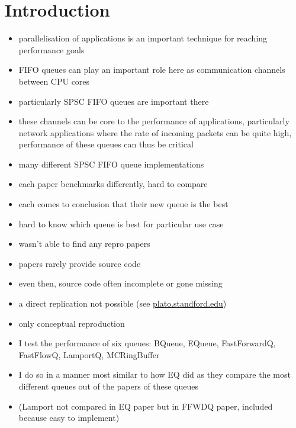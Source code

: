 \section{Introduction}
\begin{itemize}
    \item parallelisation of applications is an important technique for reaching performance goals
    \item FIFO queues can play an important role here as communication channels between CPU cores
    \item particularly SPSC FIFO queues are important there
    \item these channels can be core to the performance of applications, particularly network applications
        where the rate of incoming packets can be quite high, performance of these queues can thus be critical
    \item many different SPSC FIFO queue implementations
    \item each paper benchmarks differently, hard to compare
    \item each comes to conclusion that their new queue is the best
    \item hard to know which queue is best for particular use case
    \item wasn't able to find any repro papers
    \item papers rarely provide source code
    \item even then, source code often incomplete or gone missing
    \item a direct replication not possible (see
            \href{https://plato.stanford.edu/entries/scientific-reproducibility/#:~:text=direct
                replication%
                conceptual%
                to%
        }{plato.standford.edu})
    \item only conceptual reproduction
    \item I test the performance of six queues: BQueue, EQueue, FastForwardQ, FastFlowQ, LamportQ, MCRingBuffer
    \item I do so in a manner most similar to how EQ did as they compare the most different
        queues out of the papers of these queues
    \item (Lamport not compared in EQ paper but in FFWDQ paper, included because easy to implement)

\end{itemize}
